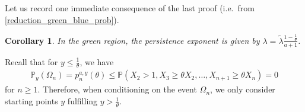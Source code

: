 \documentclass[12pt]{article}
\renewcommand{\P}{\mathbb{P}} %
\newcommand{\1}{\mathds{1}}
\theoremstyle{definition}
\theoremstyle{plain}
\newtheorem{Corollary}[definition]{Corollary}
\theoremstyle{remark}
\begin{document}
Let us record one immediate consequence of the last proof (i.e.\ from \eqref{reduction_green_blue_prob}).

\begin{Corollary}\label{pers_exp_green}
  In the green region, the persistence exponent is given by $\lambda=\tilde\lambda\frac{1-\frac{1}{\theta}}{a+1}$.
\end{Corollary}
    
Recall that for $y\le\frac{1}{\theta}$, we have 
     \begin{align*}
        \P_y(\Omega_n)=p_n^{a,y}(\theta)\leq\P(X_2>1 ,X_3\geq\theta X_2,\dots,X_{n+1}\geq\theta X_n)=0
    \end{align*}
    for $n\geq 1$. Therefore, when conditioning on the event $\Omega_n$, we only consider starting points $y$ fulfilling $y>\frac{1}{\theta}$.
\end{document}
